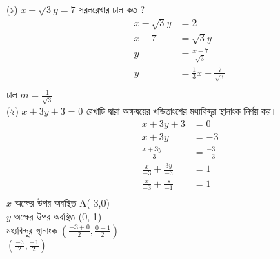 \documentclass{article}
\begin{document}
	\Large
(১) $x-\sqrt{3}y=7$ সরলরেখার ঢাল কত ?
\begin{align*}
	x-\sqrt{3}y&=2\\
	x-7&=\sqrt{3}y\\
	y&=\frac{x-7}{\sqrt{3}}\\
	y&=\frac{1}{3}x-\frac{7}{\sqrt{3}}\\	
\end{align*}
ঢাল $m=\frac{1}{\sqrt{3}}$\\
(২) $x+3y+3=0$ রেখাটি দ্বারা অক্ষদ্বয়ের খন্ডিতাংশের মধ্যবিন্দুর স্থানাংক নির্ণয় কর। 
\begin{align*}
	x+3y+3&=0\\
	x+3y&=-3\\
	\frac{x+3y}{-3}&=\frac{-3}{-3}\\
	\frac{x}{-3}+\frac{3y}{-3}&=1\\
	\frac{x}{-3}+\frac{s}{-1}&=1\\
\end{align*}
$x$ অক্ষের উপর অবস্থিত A(-3,0)\\
$y$ অক্ষের উপর অবস্থিত (0,-1)\\

মধ্যবিন্দুর স্থানাংক $\left(\frac{-3+0}{2},\frac{0-1}{2}\right)$\\
$\left(\frac{-3}{2},\frac{-1}{2}\right)$\\  
\end{document}
